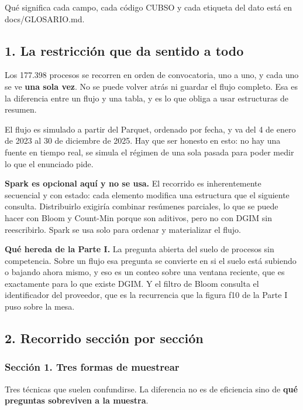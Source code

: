 \documentclass[11pt]{article}
\begin{document}
Qué significa cada campo, cada código CUBSO y cada etiqueta del dato está en docs/GLOSARIO.md.

\subsection*{1. La restricción que da sentido a todo}
Los 177.398 procesos se recorren en orden de convocatoria, uno a uno, y cada uno se ve \textbf{una sola vez}. No se puede volver atrás ni guardar el flujo completo. Esa es la diferencia entre un flujo y una tabla, y es lo que obliga a usar estructuras de resumen.

El flujo es simulado a partir del Parquet, ordenado por fecha, y va del 4 de enero de 2023 al 30 de diciembre de 2025. Hay que ser honesto en esto: no hay una fuente en tiempo real, se simula el régimen de una sola pasada para poder medir lo que el enunciado pide.

\textbf{Spark es opcional aquí y no se usa.} El recorrido es inherentemente secuencial y con estado: cada elemento modifica una estructura que el siguiente consulta. Distribuirlo exigiría combinar resúmenes parciales, lo que se puede hacer con Bloom y Count-Min porque son aditivos, pero no con DGIM sin reescribirlo. Spark se usa solo para ordenar y materializar el flujo.

\textbf{Qué hereda de la Parte I.} La pregunta abierta del suelo de procesos sin competencia. Sobre un flujo esa pregunta se convierte en si el suelo está subiendo o bajando ahora mismo, y eso es un conteo sobre una ventana reciente, que es exactamente para lo que existe DGIM. Y el filtro de Bloom consulta el identificador del proveedor, que es la recurrencia que la figura f10 de la Parte I puso sobre la mesa.

\subsection*{2. Recorrido sección por sección}
\subsubsection*{Sección 1. Tres formas de muestrear}
Tres técnicas que suelen confundirse. La diferencia no es de eficiencia sino de \textbf{qué preguntas sobreviven a la muestra}.
\end{document}
